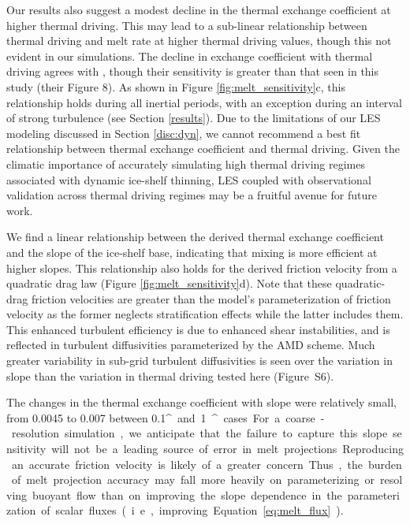 \documentclass[tc, manuscript]{copernicus}
\begin{document}
Our results also suggest a modest decline in the thermal exchange coefficient at higher thermal driving. This may lead to a sub-linear relationship between thermal driving and melt rate at higher thermal driving values, though this not evident in our simulations. The decline in exchange coefficient with thermal driving agrees with \citet{vreugdenhil_stratification_2019}, though their sensitivity is greater than that seen in this study (their Figure 8). As shown in Figure \ref{fig:melt_sensitivity}c, this relationship holds during all inertial periods, with an exception during an interval of strong turbulence (see Section \ref{results}). Due to the limitations of our LES modeling discussed in Section \ref{disc:dyn}, we cannot recommend a best fit relationship between thermal exchange coefficient and thermal driving. Given the climatic importance of accurately simulating high thermal driving regimes associated with dynamic ice-shelf thinning, LES coupled with observational validation across thermal driving regimes may be a fruitful avenue for future work.

We find a linear relationship between the derived thermal exchange coefficient and the slope of the ice-shelf base, indicating that mixing is more efficient at higher slopes. This relationship also holds for the derived friction velocity from a quadratic drag law (Figure \ref{fig:melt_sensitivity}d). Note that these quadratic-drag friction velocities are greater than the model's parameterization of friction velocity as the former neglects stratification effects while the latter includes them. This enhanced turbulent efficiency is due to enhanced shear instabilities, and is reflected in turbulent diffusivities parameterized by the AMD scheme. Much greater variability in sub-grid turbulent diffusivities is seen over the variation in slope than the variation in thermal driving tested here (Figure~S6). 

The changes in the thermal exchange coefficient with slope were relatively small, from 0.0045 to 0.007 between 0.1\unit{^{\circ}} and 1\unit{^{\circ}} cases. For a coarse-resolution simulation, we anticipate that the failure to capture this slope sensitivity will not be a leading source of error in melt projections. Reproducing an accurate friction velocity is likely of a greater concern. Thus, the burden of melt projection accuracy may fall more heavily on parameterizing or resolving buoyant flow than on improving the slope dependence in the parameterization of scalar fluxes (i.e., improving Equation~\ref{eq:melt_flux}). 
\end{document}
